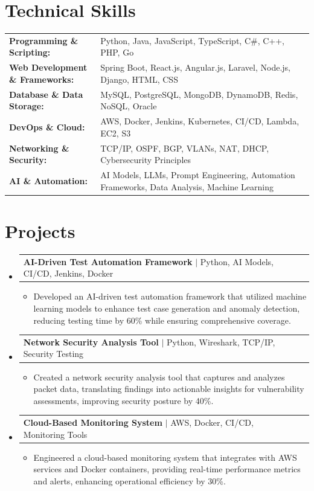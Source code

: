 \documentclass[letterpaper,10pt]{article}
\makeatletter
\newcommand{\resumeItem}[1]{
  \item{\fontsize{8pt}{9pt}\selectfont
    #1 \vspace{-3pt}
  }
}
\newcommand{\resumeProjectHeading}[2]{
    \item
    \begin{tabular*}{1.001\textwidth}{l@{\extracolsep{\fill}}r}
      \fontsize{8.5pt}{10pt}#1 & \textbf{\fontsize{8.5pt}{10pt} #2}\\
    \end{tabular*}\vspace{-7pt}
}
\newcommand{\resumeSubHeadingListStart}{\begin{itemize}[leftmargin=0pt, label={}]}
\newcommand{\resumeSubHeadingListEnd}{\end{itemize}}
\newcommand{\resumeItemListStart}{\begin{itemize}[leftmargin=*]}
\newcommand{\resumeItemListEnd}{\end{itemize}\vspace{-5pt}}
\makeatother
\begin{document}
\section{Technical Skills}
        \vspace{-14pt}
        \begin{table}[h]
            \fontsize{8pt}{9pt}\selectfont
            \begin{tabular}{p{0.3\linewidth} p{0.7\linewidth}}
                \textbf{Programming \& Scripting:} & Python, Java, JavaScript, TypeScript, C\#, C++, PHP, Go \\
                \textbf{Web Development \& Frameworks:} & Spring Boot, React.js, Angular.js, Laravel, Node.js, Django, HTML, CSS \\
                \textbf{Database \& Data Storage:} & MySQL, PostgreSQL, MongoDB, DynamoDB, Redis, NoSQL, Oracle \\
                \textbf{DevOps \& Cloud:} & AWS, Docker, Jenkins, Kubernetes, CI/CD, Lambda, EC2, S3 \\
                \textbf{Networking \& Security:} & TCP/IP, OSPF, BGP, VLANs, NAT, DHCP, Cybersecurity Principles \\
                \textbf{AI \& Automation:} & AI Models, LLMs, Prompt Engineering, Automation Frameworks, Data Analysis, Machine Learning \\
            \end{tabular}
        \end{table}
 \vspace{-18pt}

\section{Projects}
    \vspace{-5pt}
    \resumeSubHeadingListStart
          \resumeProjectHeading
            {\textbf{AI-Driven Test Automation Framework} $|$ Python, AI Models, CI/CD, Jenkins, Docker}{}
            \resumeItemListStart
                \resumeItem{Developed an AI-driven test automation framework that utilized machine learning models to enhance test case generation and anomaly detection, reducing testing time by 60\% while ensuring comprehensive coverage.}
            \resumeItemListEnd
        \vspace{-12pt}
    
        \resumeProjectHeading
            {\textbf{Network Security Analysis Tool} $|$ Python, Wireshark, TCP/IP, Security Testing}{}
        \resumeItemListStart
                \resumeItem{Created a network security analysis tool that captures and analyzes packet data, translating findings into actionable insights for vulnerability assessments, improving security posture by 40\%.}
        \resumeItemListEnd
      \vspace{-12pt}
      \resumeProjectHeading
        {\textbf{Cloud-Based Monitoring System} $|$ AWS, Docker, CI/CD, Monitoring Tools}{}
    \resumeItemListStart
            \resumeItem{Engineered a cloud-based monitoring system that integrates with AWS services and Docker containers, providing real-time performance metrics and alerts, enhancing operational efficiency by 30\%.}
    \resumeItemListEnd
    \resumeSubHeadingListEnd
\end{document}
